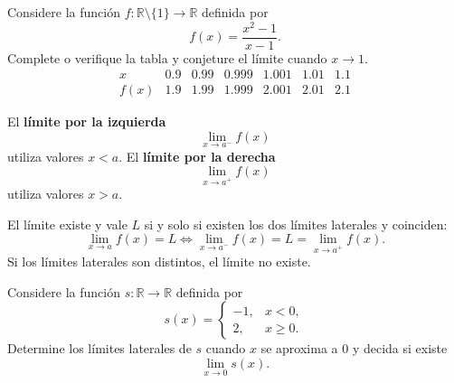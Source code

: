 \documentclass[10pt,a5paper]{article}
\newif\ifmostrarSoluciones
\begin{document}
\begin{ejemplo}
Considere la función $f\colon\mathbb{R}\setminus\{1\}\to\mathbb{R}$ definida por
\[
f(x)=\frac{x^2-1}{x-1}.
\]
Complete o verifique la tabla y conjeture el límite cuando $x\to1$.
\[
\begin{array}{c|cccccc}
x&0.9&0.99&0.999&1.001&1.01&1.1\\ \hline
f(x)&1.9&1.99&1.999&2.001&2.01&2.1
\end{array}
\]
\end{ejemplo}
\ifmostrarSoluciones
\begin{solucion}
Los valores se aproximan a $2$ desde ambos lados. Como $x^2-1=(x-1)(x+1)$,
\[
f(x)=x+1\quad(x\neq1),
\]
y la evidencia sugiere
\[
  \lim_{x\to1}f(x)=2,
\]
aunque $f(1)$ no está definida.
\end{solucion}
\else\vspace{12mm}\fi

\begin{center}
\end{center}

\begin{definicion}
El \textbf{límite por la izquierda}
\[
  \lim_{x\to a^-}f(x)
\]
utiliza valores $x<a$. El \textbf{límite por la derecha}
\[
  \lim_{x\to a^+}f(x)
\]
utiliza valores $x>a$.
\end{definicion}

\begin{proposicion}
El límite existe y vale $L$ si y solo si existen los dos límites laterales y coinciden:
\[
\lim_{x\to a}f(x)=L
\iff
\lim_{x\to a^-}f(x)=L=\lim_{x\to a^+}f(x).
\]
Si los límites laterales son distintos, el límite no existe.
\end{proposicion}

\begin{ejemplo}[salto]
Considere la función $s:\mathbb{R}\to\mathbb{R}$ definida por
\[
s(x)=
\begin{cases}
  -1, & x<0,\\
  2, & x\geq0.
\end{cases}
\]
Determine los límites laterales de $s$ cuando $x$ se aproxima a $0$ y decida si existe
\[
  \lim_{x\to0}s(x).
\]
\end{ejemplo}
\ifmostrarSoluciones
\begin{solucion}
\[
\lim_{x\to0^-}s(x)=-1,\qquad
\lim_{x\to0^+}s(x)=2.
\]
Como son distintos,
\[
  \lim_{x\to0}s(x)
\]
no existe, aunque $s(0)=2$ sí está definido.
\end{solucion}
\else\vspace{13mm}\fi
\end{document}
